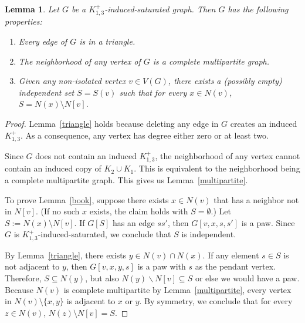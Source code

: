 \documentclass[12pt]{amsart}
\theoremstyle{plain}
\newtheorem{lem}[thm]{Lemma}
\theoremstyle{definition}
\theoremstyle{remark}
\newcommand{\paw}{\ensuremath{K_{1,3}^+}\xspace}
\begin{document}
\begin{lem}\label{lem:paw_obs}
Let $G$ be a \paw-induced-saturated graph. Then $G$ has the following properties:
\begin{enumerate}[label=(\alph*), ref=\ref{lem:paw_obs}(\alph*)]
\item\label{triangle} Every edge of $G$ is in a triangle.
\item\label{multipartite} The neighborhood of any vertex of $G$ is a complete multipartite graph.
\item\label{book} Given any non-isolated vertex $v \in V(G)$, there exists a (possibly empty) independent set $S=S(v)$ such that for every $x \in N(v)$, $S = N(x) \setminus N[v]$.
\end{enumerate}
\end{lem}
\begin{proof}
Lemma~\ref{triangle} holds because deleting any edge in $G$ creates an induced \paw. As a consequence, any vertex has degree either zero or at least two.

Since $G$ does not contain an induced $\paw$, the neighborhood of any vertex cannot contain an induced copy of $K_2 \cup K_1$.
This is equivalent to the neighborhood being a complete multipartite graph. This gives us Lemma~\ref{multipartite}.

To prove Lemma~\ref{book}, suppose there exists $x \in N(v)$ that has a neighbor not in $N[v]$. (If no such $x$ exists, the claim holds with $S = \emptyset$.)
Let $S:=N(x) \setminus N[v]$. If $G[S]$ has an edge $ss'$, then $G[v,x,s,s']$ is a paw. Since $G$ is \paw-induced-saturated, we conclude that $S$ is independent.

By Lemma~\ref{triangle}, there exists $y \in N(v) \cap N(x)$.
If any element $s \in S$ is not adjacent to $y$, then $G[v,x,y,s]$ is a paw with $s$ as the pendant vertex.
Therefore, $S \subseteq N(y)$, but also $N(y)\backslash N[v]\subseteq S$ or else we would have a paw.  Because $N(v)$ is complete multipartite by Lemma~\ref{multipartite}, every vertex in $N(v)\setminus\{x,y\}$ is adjacent to $x$ or $y$.
By symmetry, we conclude that for every $z \in N(v)$, $N(z)\setminus N[v] = S$.
\end{proof}
\end{document}
